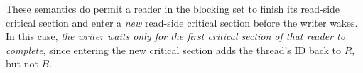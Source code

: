 These semantics do permit a reader in the blocking set to finish its read-side critical section and enter a \emph{new} read-side critical section before the writer wakes.  In this case, \emph{the writer waits only for the first critical section of that reader to complete}, since entering the new critical section adds the thread's ID back to $R$, but not $B$.

